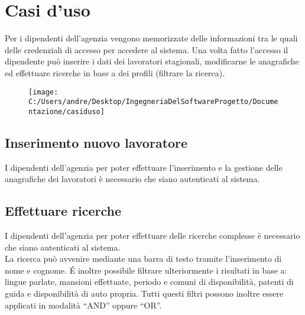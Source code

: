 \documentclass[a4paper, oneside, 12pt]{book}
\begin{document}
\newpage
\section{Casi d'uso}
Per i dipendenti dell’agenzia vengono memorizzate delle informazioni tra le quali delle credenziali di accesso per accedere al sistema. Una volta fatto l’accesso il dipendente può inserire i dati dei lavoratori stagionali, modificarne le anagrafiche ed effettuare ricerche in base a dei profili (filtrare la ricerca). 

\begin{figure}[h!]
	\centering
	\texttt{[image: C:/Users/andre/Desktop/IngegneriaDelSoftwareProgetto/Documentazione/casiduso]}
	\label{fig:casi d'uso}
\end{figure}

\subsection{Inserimento nuovo lavoratore}
I dipendenti dell’agenzia per poter effettuare l’inserimento e la gestione delle anagrafiche dei lavoratori è necessario che siano autenticati al sistema. \\



\newpage
\subsection{Effettuare ricerche}
I dipendenti dell’agenzia per poter effettuare delle ricerche complesse è necessario che siano autenticati al sistema. \\
La ricerca può avvenire mediante una barra di testo tramite l’inserimento di nome e cognome.
\'E inoltre possibile filtrare ulteriormente i risultati in base a: lingue parlate, mansioni effettuate, periodo e comuni di disponibilità,
patenti di guida e disponibilità di auto propria. Tutti questi filtri possono inoltre essere applicati in modalità “AND” oppure “OR”. \\
\end{document}
